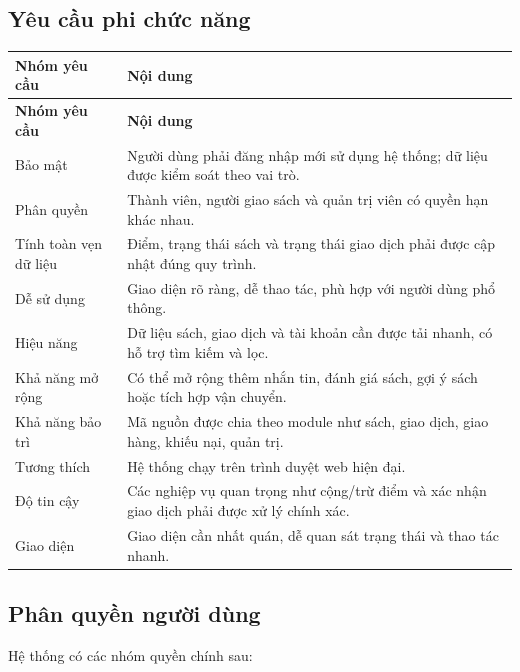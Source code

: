 \subsection{Yêu cầu phi chức năng}

\begin{longtable}{L{0.25\textwidth}L{0.65\textwidth}}
    \toprule
    \textbf{Nhóm yêu cầu} & \textbf{Nội dung} \\
    \midrule
    \endfirsthead
    \toprule
    \textbf{Nhóm yêu cầu} & \textbf{Nội dung} \\
    \midrule
    \endhead
    Bảo mật & Người dùng phải đăng nhập mới sử dụng hệ thống; dữ liệu được kiểm soát theo vai trò. \\
    Phân quyền & Thành viên, người giao sách và quản trị viên có quyền hạn khác nhau. \\
    Tính toàn vẹn dữ liệu & Điểm, trạng thái sách và trạng thái giao dịch phải được cập nhật đúng quy trình. \\
    Dễ sử dụng & Giao diện rõ ràng, dễ thao tác, phù hợp với người dùng phổ thông. \\
    Hiệu năng & Dữ liệu sách, giao dịch và tài khoản cần được tải nhanh, có hỗ trợ tìm kiếm và lọc. \\
    Khả năng mở rộng & Có thể mở rộng thêm nhắn tin, đánh giá sách, gợi ý sách hoặc tích hợp vận chuyển. \\
    Khả năng bảo trì & Mã nguồn được chia theo module như sách, giao dịch, giao hàng, khiếu nại, quản trị. \\
    Tương thích & Hệ thống chạy trên trình duyệt web hiện đại. \\
    Độ tin cậy & Các nghiệp vụ quan trọng như cộng/trừ điểm và xác nhận giao dịch phải được xử lý chính xác. \\
    Giao diện & Giao diện cần nhất quán, dễ quan sát trạng thái và thao tác nhanh. \\
    \bottomrule
\end{longtable}

\subsection{Phân quyền người dùng}

Hệ thống có các nhóm quyền chính sau:

